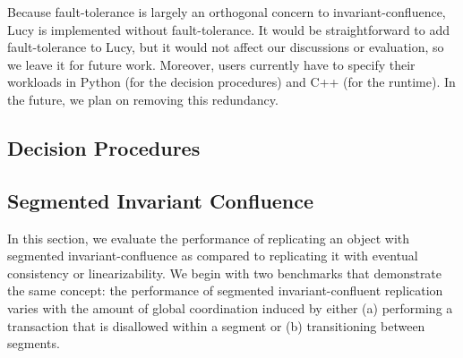 Because fault-tolerance is largely an orthogonal concern to
invariant-confluence, Lucy is implemented without fault-tolerance. It would be
straightforward to add fault-tolerance to Lucy, but it would not affect our
discussions or evaluation, so we leave it for future work. Moreover, users
currently have to specify their workloads in Python (for the decision
procedures) and C++ (for the runtime). In the future, we plan on removing this
redundancy.

\subsection{Decision Procedures}

\subsection{Segmented Invariant Confluence}%
In this section, we evaluate the performance of replicating an object with
segmented invariant-confluence as compared to replicating it with eventual
consistency or linearizability. We begin with two benchmarks that demonstrate
the same concept: the performance of segmented invariant-confluent replication
varies with the amount of global coordination induced by either (a) performing
a transaction that is disallowed within a segment or (b) transitioning between
segments.


